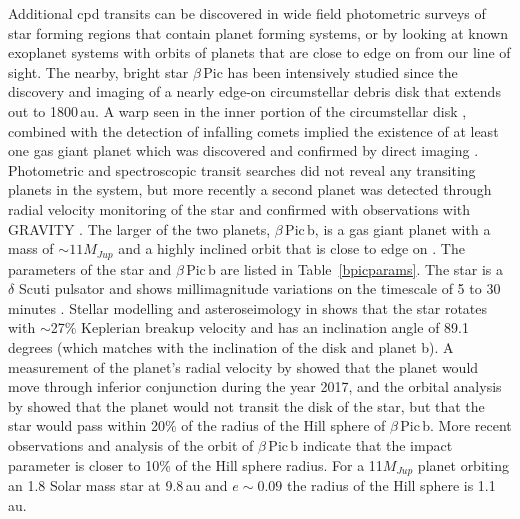 \documentclass[longauth]{aa} %
\newcommand{\bpb}{$\beta$\,Pic\,b}
\newcommand{\bp}{$\beta$\,Pic}
\begin{document}
Additional \ac{cpd} transits can be discovered in wide field photometric surveys of star forming regions that contain planet forming systems, or by looking at known exoplanet systems with orbits of planets that are close to edge on from our line of sight.
%
The nearby, bright star \bp{} \citep[$d$\,=\,19.44\,pc,  $V$\,=\,3.85;][]{vanLeeuwen07b} has been intensively studied since the discovery and imaging of a nearly edge-on circumstellar debris disk \citep{Smith84,Kalas95} that extends out to 1800\,au.
%
A warp seen in the inner portion of the circumstellar disk \citep{Heap00}, combined with the detection of infalling comets \citep[see references in ][]{Kiefer14} implied the existence of at least one gas giant planet \citep{Mouillet97,Augereau01} which was discovered and confirmed by direct imaging \citep{Lagrange09,Lagrange10}.
%
Photometric \citep{Lous18} and spectroscopic transit searches \citep{vanSluijs19} did not reveal any transiting planets in the system, but more recently a second planet was detected through radial velocity monitoring of the star \citep{Lagrange19} and confirmed with observations with GRAVITY \citep{Nowak20,Lagrange20}.
%
The larger of the two planets, \bpb{}, is a gas giant planet with a mass of $\sim 11 M_{Jup}$ \citep{Lagrange20} and a highly inclined orbit that is close to edge on \citep{Millar-Blanchaer15,Wang16,Nielsen20,Lagrange20}.
%
The parameters of the star and \bpb{} are listed in Table~\ref{bpicparams}.
%
The star is a $\delta$ Scuti pulsator and shows millimagnitude variations on the timescale of 5 to 30 minutes \citep{koen2003a,koen2003b,Merkania17,Zwintz19}.
%
Stellar modelling and asteroseimology in \citet{Zwintz19} shows that the star rotates with $\sim$27\% Keplerian breakup velocity and has an inclination angle of 89.1 degrees (which matches with the inclination of the disk and planet b).
%
A measurement of the planet's radial velocity by \citet{Snellen14} showed that the planet would move through inferior conjunction during the year 2017, and the orbital analysis by \citet{Wang16} showed that the planet would not transit the disk of the star, but that the star would pass within 20\% of the radius of the Hill sphere of \bpb{}.
%
More recent observations and analysis of the orbit of \bpb{} \citep{Lagrange19,Nielsen20} indicate that the impact parameter is closer to 10\% of the Hill sphere radius.
%
For a 11$M_{Jup}$ planet orbiting an 1.8 Solar mass star at 9.8\,au and $e\sim 0.09$ the radius of the Hill sphere is 1.1\,au.

%
%
\end{document}
